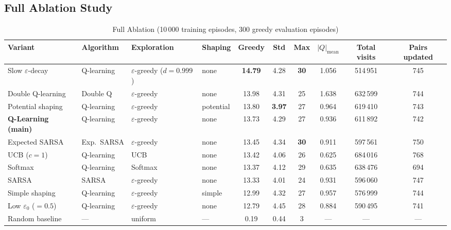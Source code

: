 \documentclass[10pt,conference]{IEEEtran}
\begin{document}
\subsection{Full Ablation Study}
\label{sec:ablation}

\begin{table}[!t]
  \centering
  \caption{Full Ablation (10\,000 training episodes,
           300 greedy evaluation episodes)}
  \label{tab:ablation}
  \begin{tabular}{llllcccccc}
    \toprule
    Variant & Algorithm & Exploration & Shaping
            & Greedy & Std & Max & $|Q|_{\text{mean}}$
            & Total visits & Pairs updated \\
    \midrule
    Slow $\varepsilon$-decay & Q-learning & $\varepsilon$-greedy ($d{=}0.999$) & none
        & \textbf{14.79} & 4.28 & \textbf{30} & 1.056 & 514\,951 & 745 \\
    Double Q-learning & Double Q   & $\varepsilon$-greedy & none
        & 13.98 & 4.31 & 25 & 1.638 & 632\,599 & 744 \\
    Potential shaping & Q-learning & $\varepsilon$-greedy & potential
        & 13.80 & \textbf{3.97} & 27 & 0.964 & 619\,410 & 743 \\
    \textbf{Q-Learning (main)} & Q-learning & $\varepsilon$-greedy & none
        & 13.73 & 4.29 & 27 & 0.936 & 611\,892 & 742 \\
    Expected SARSA & Exp.\ SARSA & $\varepsilon$-greedy & none
        & 13.45 & 4.34 & \textbf{30} & 0.911 & 597\,561 & 750 \\
    UCB ($c{=}1$) & Q-learning & UCB & none
        & 13.42 & 4.06 & 26 & 0.625 & 684\,016 & 768 \\
    Softmax & Q-learning & Softmax & none
        & 13.37 & 4.12 & 29 & 0.635 & 638\,476 & 694 \\
    SARSA & SARSA & $\varepsilon$-greedy & none
        & 13.33 & 4.01 & 24 & 0.931 & 596\,060 & 747 \\
    Simple shaping & Q-learning & $\varepsilon$-greedy & simple
        & 12.99 & 4.32 & 27 & 0.957 & 576\,999 & 744 \\
    Low $\varepsilon_0$ ($=0.5$) & Q-learning & $\varepsilon$-greedy & none
        & 12.79 & 4.45 & 28 & 0.884 & 590\,495 & 741 \\
    \midrule
    Random baseline & --- & uniform & ---
        & 0.19 & 0.44 & 3 & --- & --- & --- \\
    \bottomrule
  \end{tabular}
\end{table}
\end{document}
